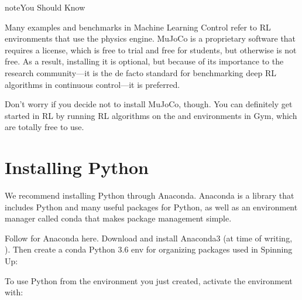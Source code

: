 \documentclass[letterpaper,10pt,english]{sphinxmanual}
\begin{document}
\begin{sphinxadmonition}{note}{You Should Know}

Many examples and benchmarks in Machine Learning Control refer to RL environments that use the  physics engine.
MuJoCo is a proprietary software that requires a license, which is free to trial and free for students, but otherwise is not free.
As a result, installing it is optional, but because of its importance to the research community—it is the de facto standard for
benchmarking deep RL algorithms in continuous control—it is preferred.

Don’t worry if you decide not to install MuJoCo, though. You can definitely get started in RL by running RL algorithms on the
 and  environments in Gym, which are totally free to use.
\end{sphinxadmonition}


\section{Installing Python}
\label{\detokenize{user/installation:installing-python}}
We recommend installing Python through Anaconda. Anaconda is a library that includes Python and many useful packages for
Python, as well as an environment manager called conda that makes package management simple.

Follow  for Anaconda here. Download and install Anaconda3 (at time of writing, ).
Then create a conda Python 3.6 env for organizing packages used in Spinning Up:

\begin{sphinxVerbatim}[commandchars=\\\{\}]
    
\end{sphinxVerbatim}

To use Python from the environment you just created, activate the environment with:

\begin{sphinxVerbatim}[commandchars=\\\{\}]
  
\end{sphinxVerbatim}
\end{document}

